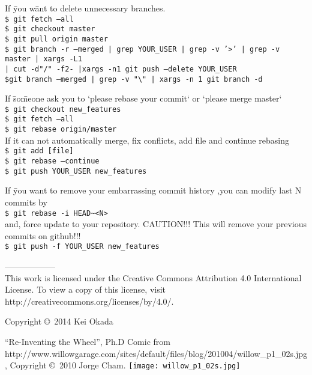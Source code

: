 \documentclass[10pt,landscape]{article}
\begin{document}
\begin{multicols}{2}
\begin{tabbing}
If \=you w\=ant to delete unnecessary branches.\\
\> \texttt{\$ git fetch --all}\\
\> \texttt{\$ git checkout master}\\
\> \texttt{\$ git pull origin master}\\
\> \texttt{\$ git branch -r --merged |  grep YOUR\_USER |  grep -v '>' |  grep -v master |  xargs -L1}\\
\>\> \texttt{|  cut -d"/" -f2- |xargs -n1 git push --delete YOUR\_USER}\\
\> \texttt{\$git branch --merged | grep -v "\textbackslash *" | xargs -n 1 git branch -d}\\
\end{tabbing}

\begin{tabbing}
If \=so\=meone ask you to `please rebase your commit` or `please merge master`\\
\> \texttt{\$ git checkout new\_features}\\  
\> \texttt{\$ git fetch --all}\\
\> \texttt{\$ git rebase origin/master}\\
If it can not automatically merge, fix conflicts, add file and continue rebasing\\
\>\> \texttt{\$ git add [file]}\\
\>\> \texttt{\$ git rebase --continue}\\
\> \texttt{\$ git push YOUR\_USER new\_features}\\  
\end{tabbing}

\begin{tabbing}
If \=you want to remove your embarrassing commit history %
,you can modify last N commits by\\
\> \texttt{\$ git rebase -i HEAD\textasciitilde<N>}\\
and, force update to your repository. CAUTION!!! This will remove your
previous commits on github!!!\\
\> \texttt{\$ git push -f YOUR\_USER new\_features}\\  
\end{tabbing}
------------------\\
\scriptsize
This work is licensed under the Creative Commons Attribution 4.0
International License. To view a copy of this license, visit
http://creativecommons.org/licenses/by/4.0/.

Copyright \copyright\ 2014 Kei Okada

\end{multicols}
\newpage

\begin{center}
``Re-Inventing the Wheel'', Ph.D Comic from
http://www.willowgarage.com/sites/default/files/blog/201004/willow\_p1\_02s.jpg,
Copyright \copyright\ 2010 Jorge Cham.
\texttt{[image: willow\_p1\_02s.jpg]}
\end{center}
\end{document}
